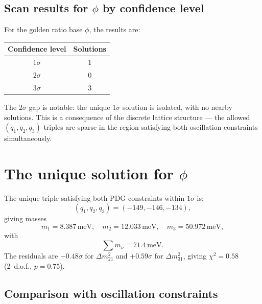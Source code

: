 \documentclass[12pt]{article}
\theoremstyle{definition}
\begin{document}
\subsection{Scan results for $\phi$ by confidence level}

For the golden ratio base $\phi$, the results are:

\begin{center}
\begin{tabular}{cc}
\toprule
Confidence level & Solutions \\
\midrule
$1\sigma$ & 1 \\
$2\sigma$ & 0 \\
$3\sigma$ & 3 \\
\bottomrule
\end{tabular}
\end{center}

The $2\sigma$ gap is notable: the unique $1\sigma$ solution is
isolated, with no nearby solutions. This is a consequence of the
discrete lattice structure — the allowed $(q_1, q_2, q_3)$ triples
are sparse in the region satisfying both oscillation constraints
simultaneously.

\section{The unique solution for $\phi$}
\label{sec:solution}

The unique triple satisfying both PDG constraints within $1\sigma$ is:
\begin{equation}
  (q_1, q_2, q_3) = (-149, -146, -134),
  \label{eq:triple}
\end{equation}
giving masses
\begin{equation}
  m_1 = 8.387\,\text{meV}, \quad
  m_2 = 12.033\,\text{meV}, \quad
  m_3 = 50.972\,\text{meV},
  \label{eq:masses}
\end{equation}
with
\begin{equation}
  \sum m_\nu = 71.4\,\text{meV}.
  \label{eq:sum}
\end{equation}
The residuals are $-0.48\sigma$ for $\Delta m^2_{21}$ and $+0.59\sigma$
for $\Delta m^2_{31}$, giving $\chi^2 = 0.58$ (2~d.o.f., $p = 0.75$).

\subsection{Comparison with oscillation constraints}
\end{document}

